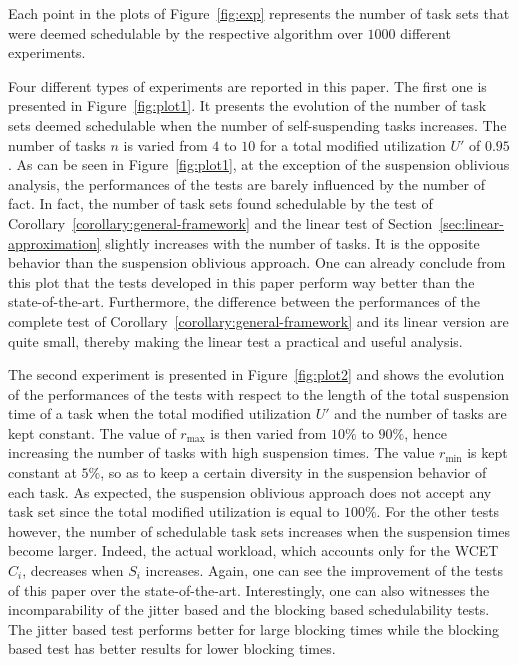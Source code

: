 Each point in the plots of Figure~\ref{fig:exp} represents the number of task sets that were deemed schedulable by the respective algorithm over $1000$ different experiments.

Four different types of experiments are reported in this paper. The first one is presented in Figure~\ref{fig:plot1}. It presents the evolution of the number of task sets deemed schedulable when the number of self-suspending tasks increases. The number of tasks $n$ is varied from $4$ to $10$ for a total modified utilization $U'$ of $0.95$. As can be seen in Figure~\ref{fig:plot1}, at the exception of the suspension oblivious analysis, the performances of the tests are barely influenced by the number of fact. In fact, the number of task sets found schedulable by the test of Corollary~\ref{corollary:general-framework} and the linear test of Section~\ref{sec:linear-approximation} slightly increases with the number of tasks. It is the opposite behavior than the suspension oblivious approach. One can already conclude from this plot that the tests developed in this paper perform way better than the state-of-the-art. Furthermore, the difference between the performances of the complete test of Corollary~\ref{corollary:general-framework} and its linear version are quite small, thereby making the linear test a practical and useful analysis.

The second experiment is presented in Figure~\ref{fig:plot2} and shows the evolution of the performances of the tests with respect to the length of the total suspension time of a task when the total modified utilization $U'$ and the number of tasks are kept constant. The value of $r_{\max}$ is then varied from $10\%$ to $90\%$, hence increasing the number of tasks with high suspension times. The value $r_{\min}$ is kept constant at $5\%$, so as to keep a certain diversity in the suspension behavior of each task. As expected, the suspension oblivious approach does not accept any task set since the total modified utilization is equal to $100\%$. For the other tests however, the number of schedulable task sets increases when the suspension times become larger. Indeed, the actual workload, which accounts only for the WCET $C_i$, decreases when $S_i$ increases. Again, one can see the improvement of the tests of this paper over the state-of-the-art. Interestingly, one can also witnesses the incomparability of the jitter based and the blocking based schedulability tests. The jitter based test performs better for large blocking times while the blocking based test has better results for lower blocking times.

